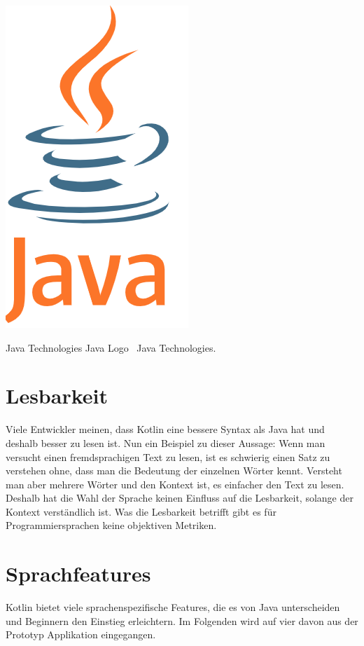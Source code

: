 \documentclass{sigchi-ext}
\begin{document}
\begin{marginfigure}[-1pc]
  \begin{minipage}{\marginparwidth}
    \includegraphics[width=0.9\marginparwidth]{figures/javalogo.png}
    \caption{Java Technologies Java Logo
      \cczero~Java Technologies.}
  \end{minipage}
\end{marginfigure}


\section{Lesbarkeit}
Viele Entwickler meinen, dass Kotlin eine bessere Syntax als Java hat und deshalb besser
zu lesen ist. Nun ein Beispiel zu dieser Aussage: Wenn man versucht einen fremdsprachigen
Text zu lesen, ist es schwierig einen Satz zu verstehen ohne, dass man die Bedeutung der
einzelnen Wörter kennt. Versteht man aber mehrere Wörter und den Kontext ist, es einfacher den
Text zu lesen. Deshalb hat die Wahl der Sprache keinen Einfluss auf die Lesbarkeit, solange
der Kontext verständlich ist.
Was die Lesbarkeit betrifft gibt es für Programmiersprachen keine objektiven Metriken.

\section{Sprachfeatures}
Kotlin bietet viele sprachenspezifische Features, die es von Java unterscheiden und Beginnern den Einstieg erleichtern. Im Folgenden wird auf vier davon aus der Prototyp Applikation eingegangen.
\end{document}
